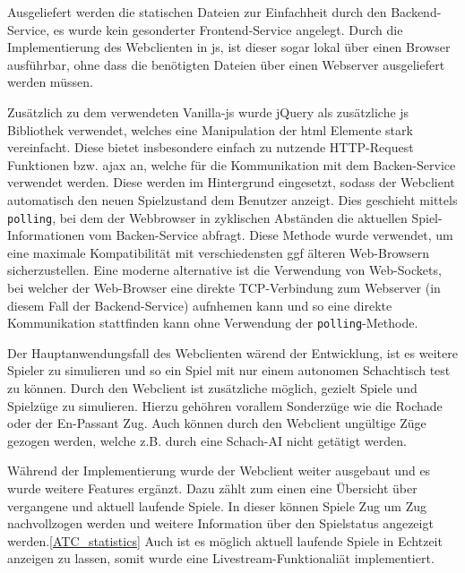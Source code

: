 Ausgeliefert werden die statischen Dateien zur Einfachheit durch den
Backend-Service, es wurde kein gesonderter Frontend-Service angelegt.
Durch die Implementierung des Webclienten in \gls{js}, ist dieser sogar
lokal über einen Browser ausführbar, ohne dass die benötigten Dateien
über einen Webserver ausgeliefert werden müssen.

Zusätzlich zu dem verwendeten Vanilla-\gls{js} wurde jQuery als
zusätzliche \gls{js} Bibliothek verwendet, welches eine Manipulation der
\gls{html} Elemente stark vereinfacht. Diese bietet insbesondere einfach
zu nutzende HTTP-Request Funktionen bzw. \gls{ajax} an, welche für die
Kommunikation mit dem Backen-Service verwendet werden. Diese werden im
Hintergrund eingesetzt, sodass der Webclient automatisch den neuen
Spielzustand dem Benutzer anzeigt. Dies geschieht mittels
\passthrough{\lstinline!polling!}, bei dem der Webbrowser in zyklischen
Abständen die aktuellen Spiel-Informationen vom Backen-Service abfragt.
Diese Methode wurde verwendet, um eine maximale Kompatibilität mit
verschiedensten ggf älteren Web-Browsern sicherzustellen. Eine moderne
alternative ist die Verwendung von Web-Sockets, bei welcher der
Web-Browser eine direkte TCP-Verbindung zum Webserver (in diesem Fall
der Backend-Service) aufnhemen kann und so eine direkte Kommunikation
stattfinden kann ohne Verwendung der
\passthrough{\lstinline!polling!}-Methode.

Der Hauptanwendungsfall des Webclienten wärend der Entwicklung, ist es
weitere Spieler zu simulieren und so ein Spiel mit nur einem autonomen
Schachtisch test zu können. Durch den Webclient ist zusätzliche möglich,
gezielt Spiele und Spielzüge zu simulieren. Hierzu gehöhren vorallem
Sonderzüge wie die Rochade oder der En-Passant Zug. Auch können durch
den Webclient ungültige Züge gezogen werden, welche z.B. durch eine
Schach-AI nicht getätigt werden.

Während der Implementierung wurde der Webclient weiter ausgebaut und es
wurde weitere Features ergänzt. Dazu zählt zum einen eine Übersicht über
vergangene und aktuell laufende Spiele. In dieser können Spiele Zug um
Zug nachvollzogen werden und weitere Information über den Spielstatus
angezeigt werden.\ref{ATC_statistics} Auch ist es möglich aktuell
laufende Spiele in Echtzeit anzeigen zu lassen, somit wurde eine
Livestream-Funktionaliät implementiert.


